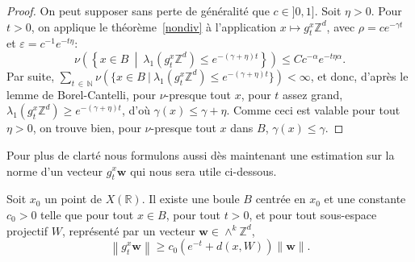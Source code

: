 \documentclass[AHL,Unicode,longabstracts,francais,published]{cedram}
\newcommand{\R}{\mathbb{R}}
\newcommand{\Z}{\mathbb{Z}}
\newcommand{\N}{\mathbb{N}}
\newcommand{\bw}{\mathbf{w}}
\newcommand{\eps}{\varepsilon}
\begin{document}
\begin{proof}
On peut supposer sans perte de généralité que $c\in]0,1]$. Soit $\eta>0$. Pour $t>0$, on applique le théorème~\ref{nondiv} à l'application $x\mapsto g_t^x\Z^d$, avec $\rho=ce^{-\gamma t}$ et $\eps=c^{-1}e^{-t\eta}$:
\[
\nu\left(\left\{x\in B\ \middle|\ \lambda_1\left(g_t^x\Z^d\right)\leq e^{-\left(\gamma+\eta\right)t}\right\}\right)
\leq Cc^{-\alpha} e^{-t\eta\alpha}.
\]
Par suite, $\sum_{t\,\in\,\N} \nu(\{x\in B\ |\ \lambda_1(g_t^x\Z^d)\leq e^{-(\gamma+\eta)t}\})<\infty$, et donc, d'après le lemme de Borel-Cantelli, pour $\nu$-presque tout $x$, pour $t$ assez grand, $\lambda_1(g_t^x\Z^d)\geq e^{-(\gamma+\eta)t}$, d'où $\gamma(x)\leq\gamma+\eta$. Comme ceci est valable pour tout $\eta>0$, on trouve bien, pour $\nu$-presque tout $x$ dans $B$, $\gamma(x)\leq\gamma$.
\end{proof}

Pour plus de clarté nous formulons aussi dès maintenant une estimation sur la norme d'un vecteur $g_t^x\bw$ qui nous sera utile ci-dessous.

\begin{lemm}\label{est}
Soit $x_0$ un point de $X(\R)$. Il existe une boule $B$ centrée en $x_0$ et une constante $c_0>0$ telle que pour tout $x\in B$, pour tout $t>0$, et pour tout sous-espace projectif $W$, représenté par un vecteur $\bw\in\wedge^k\Z^d$,
\[
\left\|g_t^x\bw\right\| \geq c_0\left(e^{-t} + d(x,W)\right)\|\bw\|.
\]
\end{lemm}
\end{document}
